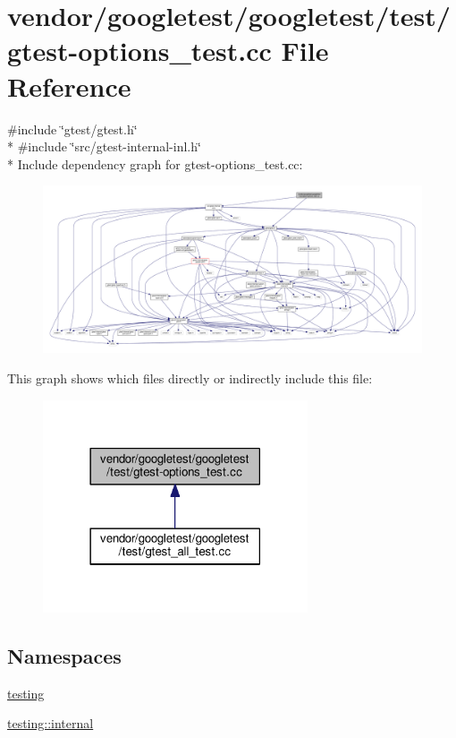 \hypertarget{gtest-options__test_8cc}{}\section{vendor/googletest/googletest/test/gtest-\/options\+\_\+test.cc File Reference}
\label{gtest-options__test_8cc}
{\ttfamily \#include \char`\"{}gtest/gtest.\+h\char`\"{}}\\*
{\ttfamily \#include \char`\"{}src/gtest-\/internal-\/inl.\+h\char`\"{}}\\*
Include dependency graph for gtest-\/options\+\_\+test.cc\+:
\nopagebreak
\begin{figure}[H]
\begin{center}
\leavevmode
\includegraphics[width=350pt]{gtest-options__test_8cc__incl}
\end{center}
\end{figure}
This graph shows which files directly or indirectly include this file\+:
\nopagebreak
\begin{figure}[H]
\begin{center}
\leavevmode
\includegraphics[width=222pt]{gtest-options__test_8cc__dep__incl}
\end{center}
\end{figure}
\subsection*{Namespaces}
\begin{DoxyCompactItemize}
\item 
 \hyperlink{namespacetesting}{testing}
\item 
 \hyperlink{namespacetesting_1_1internal}{testing\+::internal}
\end{DoxyCompactItemize}
